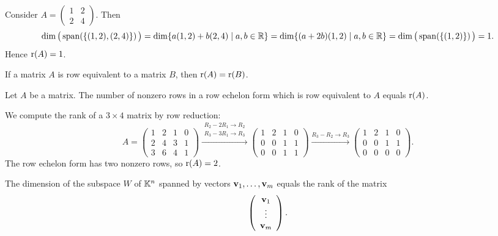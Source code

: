 \begin{example}
Consider $A=\left( \begin{smallmatrix} 1 & 2\\ 2 & 4 \end{smallmatrix} \right)$. Then
\[
\dim\big(\operatorname{span}\!\left(\{(1,2),(2,4)\}\right)\big) = \dim\{a(1,2)+b(2,4)\mid a,b\in \mathbb{R}\}
= \dim\{(a+2b)(1,2)\mid a,b\in \mathbb{R}\} = \dim\big(\operatorname{span}\!\left(\{(1,2)\}\right)\big)=1.
\]
Hence $\operatorname{r}(A)=1$.
\end{example}

\begin{theorem}
If a matrix $A$ is row equivalent to a matrix $B$, then $\operatorname{r}(A)=\operatorname{r}(B)$.
\end{theorem}

\begin{theorem}
Let $A$ be a matrix. The number of nonzero rows in a row echelon form which is row equivalent to $A$ equals
$\operatorname{r}(A)$.
\end{theorem}

\begin{example}
We compute the rank of a $3\times 4$ matrix by row reduction:
\[
A = \left( \begin{array}{cccc} 1 & 2 & 1 & 0 \\ 2 & 4 & 3 & 1 \\ 3 & 6 & 4 & 1 \end{array} \right)
\xrightarrow{\substack{R_2-2R_1\to R_2\\ R_3-3R_1\to R_3}}
\left( \begin{array}{cccc} 1 & 2 & 1 & 0 \\ 0 & 0 & 1 & 1 \\ 0 & 0 & 1 & 1 \end{array} \right)
\xrightarrow{R_3-R_2\to R_3}
\left( \begin{array}{cccc} 1 & 2 & 1 & 0 \\ 0 & 0 & 1 & 1 \\ 0 & 0 & 0 & 0 \end{array} \right).
\]
The row echelon form has two nonzero rows, so $\operatorname{r}(A) = 2$.
\end{example}

\begin{theorem}
The dimension of the subspace $W$ of $\mathbb{K}^n$ spanned by vectors $\mathbf{v}_1,\ldots, \mathbf{v}_m$ equals the rank of the
matrix
\[
\left( \begin{array}{c} \mathbf{v}_1\\ \vdots \\ \mathbf{v}_m \end{array} \right).
\]
\end{theorem}

